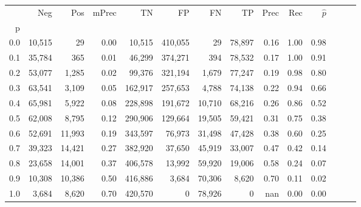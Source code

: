 \begin{tabular}{rrrrrrrrrrrrrr}
\toprule
{} &     Neg &     Pos & mPrec &       TN &       FP &      FN &      TP &  Prec &   Rec & $\hat{p}$ \\
p   &         &         &       &          &          &         &         &       &       &           \\
\midrule
0.0 &  10,515 &      29 &  0.00 &   10,515 &  410,055 &      29 &  78,897 &  0.16 &  1.00 &      0.98 \\
0.1 &  35,784 &     365 &  0.01 &   46,299 &  374,271 &     394 &  78,532 &  0.17 &  1.00 &      0.91 \\
0.2 &  53,077 &   1,285 &  0.02 &   99,376 &  321,194 &   1,679 &  77,247 &  0.19 &  0.98 &      0.80 \\
0.3 &  63,541 &   3,109 &  0.05 &  162,917 &  257,653 &   4,788 &  74,138 &  0.22 &  0.94 &      0.66 \\
0.4 &  65,981 &   5,922 &  0.08 &  228,898 &  191,672 &  10,710 &  68,216 &  0.26 &  0.86 &      0.52 \\
0.5 &  62,008 &   8,795 &  0.12 &  290,906 &  129,664 &  19,505 &  59,421 &  0.31 &  0.75 &      0.38 \\
0.6 &  52,691 &  11,993 &  0.19 &  343,597 &   76,973 &  31,498 &  47,428 &  0.38 &  0.60 &      0.25 \\
0.7 &  39,323 &  14,421 &  0.27 &  382,920 &   37,650 &  45,919 &  33,007 &  0.47 &  0.42 &      0.14 \\
0.8 &  23,658 &  14,001 &  0.37 &  406,578 &   13,992 &  59,920 &  19,006 &  0.58 &  0.24 &      0.07 \\
0.9 &  10,308 &  10,386 &  0.50 &  416,886 &    3,684 &  70,306 &   8,620 &  0.70 &  0.11 &      0.02 \\
1.0 &   3,684 &   8,620 &  0.70 &  420,570 &        0 &  78,926 &       0 &   nan &  0.00 &      0.00 \\
\bottomrule
\end{tabular}
